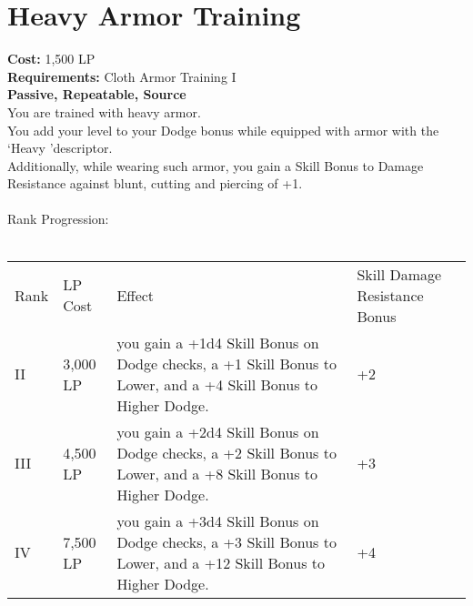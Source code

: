 \section{Heavy Armor Training}\label{perk:heavyArmorTraining}
\textbf{Cost:} 1,500 LP\\
\textbf{Requirements:} Cloth Armor Training I\\
\textbf{Passive, Repeatable, Source}\\
You are trained with heavy armor.\\
You add your level to your Dodge bonus while equipped with armor with the \lq Heavy \rq descriptor.\\
Additionally, while wearing such armor, you gain a Skill Bonus to Damage Resistance against blunt, cutting and piercing of +1.\\
\\

Rank Progression:\\
\\
\begin{longtable}{l | l | l | p{9cm}}
    Rank & LP Cost & Effect & Skill Damage Resistance Bonus \\
    II
    & 3,000 LP
    & you gain a +1d4 Skill Bonus on Dodge checks, a +1 Skill Bonus to Lower, and a +4 Skill Bonus to Higher Dodge.
    & +2
    \\
    III
    & 4,500 LP
    & you gain a +2d4 Skill Bonus on Dodge checks, a +2 Skill Bonus to Lower, and a +8 Skill Bonus to Higher Dodge.
    & +3
    \\
    IV
    & 7,500 LP
    & you gain a +3d4 Skill Bonus on Dodge checks, a +3 Skill Bonus to Lower, and a +12 Skill Bonus to Higher Dodge.
    & +4
    \\
\end{longtable}
